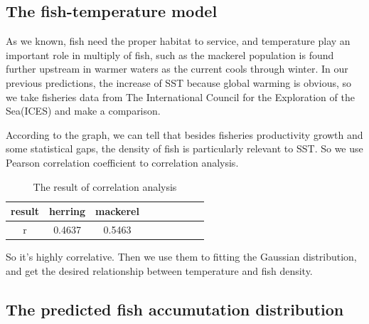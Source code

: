 \documentclass{mcmthesis}
\begin{document}
 \subsection{The fish-temperature model}
  As we known, fish need the proper habitat to service, and temperature play an important role in multiply of fish, such as the mackerel population is found further upstream in warmer waters as the current cools through winter\cite{jansen2012migration}. In our previous predictions, the increase of  SST because global warming is obvious, so we take fisheries data  from The International Council for the Exploration of the Sea(ICES) and make a comparison. 


  According to the graph, we can tell that besides fisheries productivity growth and some statistical gaps, the density of fish is particularly relevant to SST. So we use Pearson correlation coefficient to correlation analysis. 

  \begin{table}[!htb]
    \centering
    \setlength{\abovecaptionskip}{0pt}%
    \setlength{\belowcaptionskip}{15pt}%
    \caption{The result of correlation analysis}
    \begin{tabular}{ccccccccc}
    \toprule[1.5pt]
    result &herring &mackerel\\
    \toprule[1.5pt]
    r&0.4637&0.5463\\
    \bottomrule[1.5pt]
    \end{tabular}
  \end{table}

  So it's highly correlative. Then we use them to fitting the Gaussian distribution, and get the desired relationship between temperature and fish density.


  \subsection{The predicted fish accumutation distribution}
\end{document}
